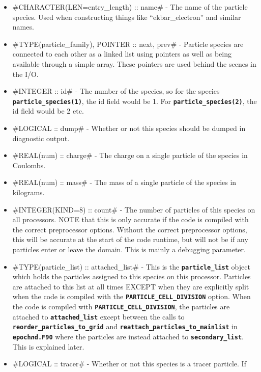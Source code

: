 \documentclass[12pt,a4paper]{article}
\newcommand{\inlinecode}[1]{{\color{warwickred} \bf\texttt{#1}}}
\begin{document}
\begin{itemize}
\item #CHARACTER(LEN=entry_length) :: name# - The name of the particle
  species. Used when constructing things like ``ekbar\_electron'' and similar
  names.
\item #TYPE(particle_family), POINTER :: next, prev# - Particle species are
  connected to each other as a linked list using pointers as well as being
  available through a simple array. These pointers are used behind the scenes
  in the I/O.
\item #INTEGER :: id# - The number of the species, so for the species
  \inlinecode{particle\_species(1)}, the id field would be 1. For
  \inlinecode{particle\_species(2)}, the id field would be 2 etc.
\item #LOGICAL :: dump# - Whether or not this species should be dumped in
  diagnostic output.
\item #REAL(num) :: charge# - The charge on a single particle of the species in
  Coulombs.
\item #REAL(num) :: mass# - The mass of a single particle of the species in
  kilograms.
\item #INTEGER(KIND=8) :: count# - The number of particles of this species on
  all processors. NOTE that this is only accurate if the code is compiled with
  the correct preprocessor options. Without the correct preprocessor options,
  this will be accurate at the start of the code runtime, but will not be if
  any particles enter or leave the domain. This is mainly a debugging
  parameter.
\item #TYPE(particle_list) :: attached_list# - This is the
  \inlinecode{particle\_list} object which holds the particles assigned to this
  species on this processor. Particles are attached to this list at all
  \linebreak times EXCEPT when they are explicitly split when the code is
  compiled with the\linebreak
  \inlinecode{PARTICLE\_CELL\_DIVISION} option. When the code is compiled with
  \inlinecode{PARTICLE\_CELL\_DIVISION}, the particles are attached to
  \inlinecode{attached\_list} except between the calls to
  \inlinecode{reorder\_particles\_to\_grid} and
  \inlinecode{reattach\_particles\_to\_mainlist} in
  \inlinecode{epoch{\it n}d.F90} where the particles are instead attached to
  \inlinecode{secondary\_list}. This is explained later.
\item #LOGICAL :: tracer# - Whether or not this species is a tracer particle. If

\end{itemize}
\end{document}
